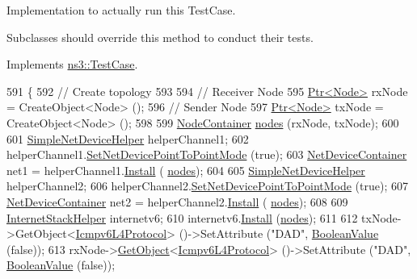 Implementation to actually run this Test\+Case. 

Subclasses should override this method to conduct their tests. 

Implements \hyperlink{classns3_1_1TestCase_a8ff74680cf017ed42011e4be51917a24}{ns3\+::\+Test\+Case}.


\begin{DoxyCode}
591 \{
592   \textcolor{comment}{// Create topology}
593 
594   \textcolor{comment}{// Receiver Node}
595   \hyperlink{classns3_1_1Ptr}{Ptr<Node>} rxNode = CreateObject<Node> ();
596   \textcolor{comment}{// Sender Node}
597   \hyperlink{classns3_1_1Ptr}{Ptr<Node>} txNode = CreateObject<Node> ();
598 
599   \hyperlink{classns3_1_1NodeContainer}{NodeContainer} \hyperlink{visualizer-ideas_8txt_a3e1b3808014a2c68ab0cd0182e041be2}{nodes} (rxNode, txNode);
600 
601   \hyperlink{classns3_1_1SimpleNetDeviceHelper}{SimpleNetDeviceHelper} helperChannel1;
602   helperChannel1.\hyperlink{classns3_1_1SimpleNetDeviceHelper_a474460ba6942d4933f443a97df7d4716}{SetNetDevicePointToPointMode} (\textcolor{keyword}{true});
603   \hyperlink{classns3_1_1NetDeviceContainer}{NetDeviceContainer} net1 = helperChannel1.\hyperlink{classns3_1_1SimpleNetDeviceHelper_a35bed9cee32d306362d3e24dfeef4513}{Install} (
      \hyperlink{visualizer-ideas_8txt_a3e1b3808014a2c68ab0cd0182e041be2}{nodes});
604 
605   \hyperlink{classns3_1_1SimpleNetDeviceHelper}{SimpleNetDeviceHelper} helperChannel2;
606   helperChannel2.\hyperlink{classns3_1_1SimpleNetDeviceHelper_a474460ba6942d4933f443a97df7d4716}{SetNetDevicePointToPointMode} (\textcolor{keyword}{true});
607   \hyperlink{classns3_1_1NetDeviceContainer}{NetDeviceContainer} net2 = helperChannel2.\hyperlink{classns3_1_1SimpleNetDeviceHelper_a35bed9cee32d306362d3e24dfeef4513}{Install} (
      \hyperlink{visualizer-ideas_8txt_a3e1b3808014a2c68ab0cd0182e041be2}{nodes});
608 
609   \hyperlink{classns3_1_1InternetStackHelper}{InternetStackHelper} internetv6;
610   internetv6.\hyperlink{classns3_1_1InternetStackHelper_a6645b412f31283d2d9bc3d8a95cebbc0}{Install} (\hyperlink{visualizer-ideas_8txt_a3e1b3808014a2c68ab0cd0182e041be2}{nodes});
611 
612   txNode->GetObject<\hyperlink{classns3_1_1Icmpv6L4Protocol}{Icmpv6L4Protocol}> ()->SetAttribute (\textcolor{stringliteral}{"DAD"}, 
      \hyperlink{classns3_1_1BooleanValue}{BooleanValue} (\textcolor{keyword}{false}));
613   rxNode->\hyperlink{classns3_1_1Object_a13e18c00017096c8381eb651d5bd0783}{GetObject}<\hyperlink{classns3_1_1Icmpv6L4Protocol}{Icmpv6L4Protocol}> ()->SetAttribute (\textcolor{stringliteral}{"DAD"}, 
      \hyperlink{classns3_1_1BooleanValue}{BooleanValue} (\textcolor{keyword}{false}));

\end{DoxyCode}
